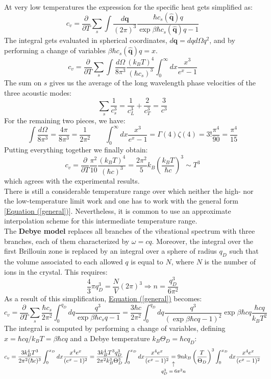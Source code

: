 \documentclass[10.75pt,a4paper,openright,bottom=2cm]{article}
\renewcommand{\Vec}[1]{\boldsymbol{#1}}
\begin{document}
At very low temperatures the expression for the specific heat gets simplified as:
\[
c_v=\frac{\partial}{\partial T}\sum_s\int\frac{d\Vec{q}}{(2\pi)^3}\frac{\hbar c_s(\hat{\Vec{q}})q}{\exp{\beta\hbar c_s(\hat{\Vec{q}})q}-1}
\]
The integral gets evaluated in spherical coordinates, $d\Vec{q}=dqd\Omega q^2$, and by performing a change of variables $\beta\hbar c_s(\hat{\Vec{q}})q=x$.
\[
c_v=\frac{\partial}{\partial T}\sum_s\int\frac{d\Omega}{8\pi^3}\frac{(k_BT)^4}{(\hbar c_s)^3}\int_0^\infty dx\frac{x^3}{e^x-1}
\]
The sum on $s$ gives us the average of the long wavelength phase velocities of the three acoustic modes:
\[
\sum_s\frac{1}{c_s^3}=\frac{1}{c_L^3}+\frac{2}{c_T^3}=\frac{3}{c^3}
\]
For the remaining two pieces, we have:
\[
\int\frac{d\Omega}{8\pi^3}=\frac{4\pi}{8\pi^3}=\frac{1}{2\pi^2} \qquad \int_0^\infty dx\frac{x^3}{e^x-1}=\Gamma(4)\zeta(4)=3!\frac{\pi^4}{90}=\frac{\pi^4}{15}
\]
Putting everything together we finally obtain:
\[
c_v=\frac{\partial}{\partial T}\frac{\pi^2}{10}\frac{(k_BT)^4}{(\hbar c)^3}=\frac{2\pi^2}{5}k_B\left(\frac{k_BT}{\hbar c}\right)^3\sim T^3
\]
which agrees with the experimental results.\\
There is still a considerable temperature range over which neither the high- nor the low-temperature limit work and one has to work with the general form [\hyperref[general]{Equation (\ref{general})}]. Nevertheless, it is common to use an approximate interpolation scheme for this intermediate temperature range.\\
The \textbf{Debye model} replaces all branches of the vibrational spectrum with three branches, each of them characterized by $\omega=cq$. Moreover, the integral over the first Brillouin zone is replaced by an integral over a sphere of radius $q_D$ such that the volume associated to each allowed $q$ is equal to $N$, where $N$ is the number of ions in the crystal. This requires:
\[
\frac{4}{3}\pi q_D^3=\frac{N}{V}(2\pi)^3\Rightarrow n=\frac{q_D^3}{6\pi^2}
\]
As a result of this simplification, \hyperref[general]{Equation (\ref{general})} becomes:
\[
c_v=\frac{\partial}{\partial T}\sum_s\frac{\hbar c_s}{2\pi^2}\int_0^{q_D}dq\frac{q^3}{\exp{\beta\hbar c_sq}-1}=\frac{3\hbar c}{2\pi^2}\int_0^{q_D}dq\frac{q^3}{(\exp{\beta\hbar cq}-1)^2}\exp{\beta\hbar cq}\frac{\hbar cq}{k_BT^2}
\]
The integral is computed by performing a change of variables, defining $x=\hbar cq/k_BT=\beta\hbar cq$ and a Debye temperature $k_B\Theta_D=\hbar cq_D$:
\[
c_v=\frac{3k_B^4T^3}{2\pi^2(\hbar c)^3}\int_0^{x_D}dx\frac{x^4e^x}{(e^x-1)^2}=\frac{3k_B^4T^3q_D^3}{2\pi^2k_B^3\Theta_D^3}\int_0^{x_D}dx\frac{x^4e^x}{(e^x-1)^2}\underset{\mathclap{\tikz \node {$\uparrow$} node [below=1ex] {\footnotesize $q_D^3=6\pi^2n$};}}{=}9nk_B\left(\frac{T}{\Theta_D}\right)^3\int_0^{x_D}dx\frac{x^4e^x}{(e^x-1)^2}
\]
\end{document}
